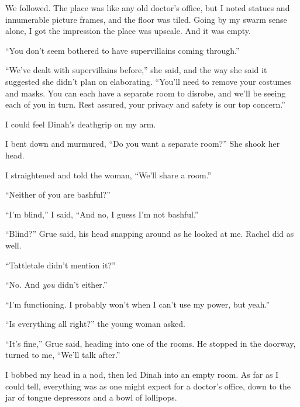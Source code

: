 We followed.  The place was like any old doctor's office, but I noted statues and innumerable picture frames, and the floor was tiled.  Going by my swarm sense alone, I got the impression the place was upscale.  And it was empty.



``You don't seem bothered to have supervillains coming through.''



``We've dealt with supervillains before,'' she said, and the way she said it suggested she didn't plan on elaborating.  ``You'll need to remove your costumes and masks.  You can each have a separate room to disrobe, and we'll be seeing each of you in turn.  Rest assured, your privacy and safety is our top concern.''



I could feel Dinah's deathgrip on my arm.



I bent down and murmured, ``Do you want a separate room?''   She shook her head.



I straightened and told the woman, ``We'll share a room.''



``Neither of you are bashful?''



``I'm blind,'' I said, ``And no, I guess I'm not bashful.''



``Blind?'' Grue said, his head snapping around as he looked at me.  Rachel did as well.



``Tattletale didn't mention it?''



``No.  And \emph{you} didn't either.''



``I'm functioning.  I probably won't when I can't use my power, but yeah.''



``Is everything all right?'' the young woman asked.



``It's fine,'' Grue said, heading into one of the rooms.  He stopped in the doorway, turned to me, ``We'll talk after.''



I bobbed my head in a nod, then led Dinah into an empty room.  As far as I could tell, everything was as one might expect for a doctor's office, down to the jar of tongue depressors and a bowl of lollipops.



